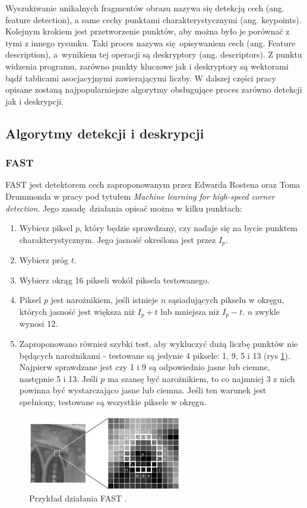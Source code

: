 \documentclass[12pt,twoside,polish]{article}
\begin{document}
Wyszukiwanie unikalnych fragmentów obrazu nazywa się detekcją cech (ang. feature detection), a same cechy punktami charakterystycznymi (ang. keypoints). Kolejnym krokiem jest przetworzenie punktów, aby można było je porównać z tymi z innego rysunku. Taki proces nazywa się opisywaniem cech (ang. Feature description), a~wynikiem tej operacji są deskryptory (ang. descriptors). Z punktu widzenia programu, zarówno punkty kluczowe jak i deskryptory są wektorami bądź tablicami asocjacyjnymi zawierającymi liczby. W dalszej części pracy opisane zostaną najpopularniejsze algorytmy obsługujące proces zarówno detekcji jak i deskrypcji.


\subsection{Algorytmy detekcji i deskrypcji}

\subsubsection{FAST}

FAST jest detektorem cech zaproponowanym przez Edwarda Rostena oraz Toma Drummonda w pracy pod tytułem \emph{Machine learning for high-speed corner detection}. Jego zasadę działania opisać można w kilku punktach:
\begin{enumerate}
	\item Wybierz piksel $p$, który będzie sprawdzany, czy nadaje się na bycie punktem charakterystycznym. Jego jasność określona jest przez $I_p$.
	\item Wybierz próg $t$.
	\item Wybierz okrąg 16 pikseli wokół piksela testowanego.
	\item Piksel $p$ jest narożnikiem, jeśli istnieje $n$ sąsiadujących pikselu w okręgu, których jasność jest większa niż $I_p + t$ lub mniejsza niż $I_p - t$. $n$ zwykle wynosi 12.
	\item Zaproponowano również szybki test, aby wykluczyć dużą liczbę punktów nie będących narożnikami - testowane są jedynie 4 piksele: 1, 9, 5 i 13 (rys \ref{fast}). Najpierw sprawdzane jest czy 1 i 9 są odpowiednio jasne lub ciemne, następnie 5 i 13. Jeśli $p$ ma szansę być narożnikiem, to co najmniej 3 z nich powinna być wystarczająco jasne lub ciemna. Jeśli ten warunek jest spełniony, testowane są wszystkie piksele w okręgu.
\end{enumerate}

\begin{figure}[h]
	\centering
	\includegraphics[width=0.6\textwidth]{fast}
	\caption{Przykład działania FAST \cite{fast_img}.}
	\label{fast}
\end{figure}
\end{document}
